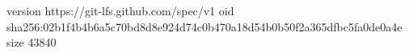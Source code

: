 version https://git-lfs.github.com/spec/v1
oid sha256:02b1f4b4b6a5c70bd8d8e924d74c0b470a18d54b0b50f2a365dfbc5fa0de0a4e
size 43840
